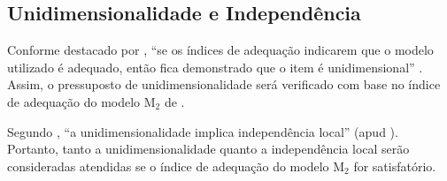 \begin{comment}
(buscar referencias)

Além disso, foram = avaliado o Akaike Information Criterion (AIC), criado por Akaike (1974) e o Deviance Information Criterion (DIC). Segundo esses critérios, o modelo com o menor valores de AIC e DIC se ajustam melhor aos dados \cite{raftery2006}.


\begin{table}[!htb]
	\IBGEtab{%
		\caption{Classificação da questão de acordo com parâmetro de dificuldade.}
		\label{tabela-class-b}
	}{%
		\begin{tabular}{ccc}
			\toprule
		Intervalo de Dificuldade \\ Escala ENEM &	Classificação & Distribuição Esperada   \\ 
			\midrule \midrule
			Até 372 & Muito Fácil & 10\%   \\ 
			\midrule
			Entre a e c & Fácil & 20\%   \\ 
			\midrule
			Entre a e c & Mediano & 40\%   \\ 
						\midrule
			Entre a e c & Difícil & 20\%   \\ 
						\midrule
			Entre a e c & Muito Difícil & 10\%   \\ 
			\bottomrule
		\end{tabular}
	}{%
		\fonte{\citeonline{rabelo2013}, p.134}
	}
\end{table}


\end{comment}


\subsection{Unidimensionalidade e Independência}

Conforme destacado por ,  ``se os índices de adequação indicarem que o modelo utilizado é adequado, então fica demonstrado que o item é unidimensional'' . Assim, o pressuposto de unidimensionalidade será verificado com base no índice de adequação do modelo M$_2$ de . 


Segundo , ``a unidimensionalidade implica independência local'' (apud \cite{hambleton1991}). Portanto, tanto a unidimensionalidade quanto a independência local serão consideradas atendidas se o índice de adequação do modelo M$_2$ for satisfatório.

